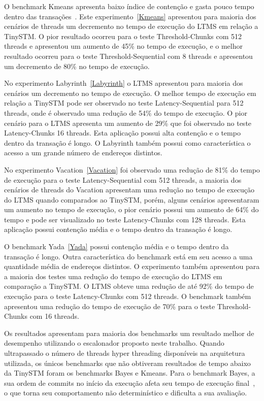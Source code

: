 \documentclass[diss,capa]{texufpel}
\begin{document}
O benchmark Kmeans apresenta baixo índice de contenção e gasta pouco tempo dentro das transações~\cite{STAMP}. Este experimento~\ref{Kmeans} apresentou para maioria dos cenários de threads um decremento no tempo de execução do LTMS em relação a TinySTM. O pior resultado ocorreu para o teste Threshold-Chunks com 512 threads e apresentou um aumento de 45\% no tempo de execução, e o melhor resultado ocorreu para o teste Threshold-Sequential com 8 threads e apresentou um decremento de 80\% no tempo de execução.



No experimento Labyrinth~\ref{Labyrinth} o LTMS apresentou para maioria dos cenários um decremento no tempo de execução. O melhor tempo de execução em relação a TinySTM pode ser observado no teste Latency-Sequential para 512 threads, onde é observado uma redução de 54\% do tempo de execução. O pior cenário para o LTMS apresenta um aumento de 29\% que foi observado no teste Latency-Chunks 16 threads. Esta aplicação possui alta contenção e o tempo dentro da transação é longo. O Labyrinth também possui como característica o acesso a um grande número de endereços distintos.

No experimento Vacation~\ref{Vacation} foi observado uma redução de 81\% do tempo de execução para o teste Latency-Sequential com 512 threads, a maioria dos cenários de threads do Vacation apresentam uma redução no tempo de execução do LTMS quando comparados ao TinySTM, porém, alguns cenários apresentaram um aumento no tempo de execução, o pior cenário possui um aumento de 64\% do tempo e pode ser visualizado no teste Latency-Chunks com 128 threads. Esta aplicação possui contenção média e o tempo dentro da transação é longo.

O benchmark Yada~\ref{Yada} possui contenção média e o tempo dentro da transação é longo. Outra característica do benchmark está em seu acesso a uma quantidade média de endereços distintos. O experimento também apresentou para a maioria dos testes uma redução do tempo de execução do LTMS em comparação a TinySTM. O LTMS obteve uma redução de até 92\% do tempo de execução para o teste Latency-Chunks com 512 threads. O benchmark também apresentou uma redução do tempo de execução de 70\% para o teste Threshold-Chunks com 16 threads.

Os resultados apresentam para maioria dos benchmarks um resultado melhor de desempenho utilizando o escalonador proposto neste trabalho. Quando ultrapassado o número de threads hyper threading disponíveis na arquitetura utilizada, os únicos benchmarks que não obtiveram resultados de tempo abaixo da TinySTM foram os benchmarks Bayes e Kmeans. Para o benchmark Bayes, a sua ordem de commits no início da execução afeta seu tempo de execução final~\cite{Ruan:2014}, o que torna seu comportamento não determinístico e dificulta a sua avaliação.
\end{document}

